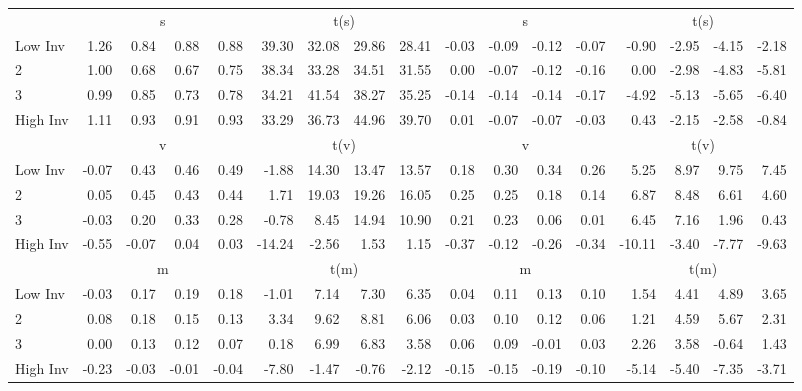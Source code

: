 \begin{table}[!ht]
\begin{tabular}{lrrrrrrrrrrrrrrrr}
  
     & \multicolumn{4}{c}{s} & \multicolumn{4}{c}{t(s)}  & \multicolumn{4}{c}{s} & \multicolumn{4}{c}{t(s)}   \\
     \cmidrule(r){2-5} \cmidrule(r){6-9}  \cmidrule(r){10-13} \cmidrule(r){14-17} 
    Low Inv  & 1.26  & 0.84  & 0.88  & 0.88  & 39.30  & 32.08  & 29.86  & 28.41  & -0.03  & -0.09  & -0.12  & -0.07  & -0.90  & -2.95  & -4.15  & -2.18   \\
    2  & 1.00  & 0.68  & 0.67  & 0.75  & 38.34  & 33.28  & 34.51  & 31.55  & 0.00  & -0.07  & -0.12  & -0.16  & 0.00  & -2.98  & -4.83  & -5.81   \\
    3  & 0.99  & 0.85  & 0.73  & 0.78  & 34.21  & 41.54  & 38.27  & 35.25  & -0.14  & -0.14  & -0.14  & -0.17  & -4.92  & -5.13  & -5.65  & -6.40   \\
    High Inv  & 1.11  & 0.93  & 0.91  & 0.93  & 33.29  & 36.73  & 44.96  & 39.70  & 0.01  & -0.07  & -0.07  & -0.03  & 0.43  & -2.15  & -2.58  & -0.84   \\
    
  
     & \multicolumn{4}{c}{v} & \multicolumn{4}{c}{t(v)}  & \multicolumn{4}{c}{v} & \multicolumn{4}{c}{t(v)}   \\
     \cmidrule(r){2-5} \cmidrule(r){6-9}  \cmidrule(r){10-13} \cmidrule(r){14-17} 
    Low Inv  & -0.07  & 0.43  & 0.46  & 0.49  & -1.88  & 14.30  & 13.47  & 13.57  & 0.18  & 0.30  & 0.34  & 0.26  & 5.25  & 8.97  & 9.75  & 7.45   \\
    2  & 0.05  & 0.45  & 0.43  & 0.44  & 1.71  & 19.03  & 19.26  & 16.05  & 0.25  & 0.25  & 0.18  & 0.14  & 6.87  & 8.48  & 6.61  & 4.60   \\
    3  & -0.03  & 0.20  & 0.33  & 0.28  & -0.78  & 8.45  & 14.94  & 10.90  & 0.21  & 0.23  & 0.06  & 0.01  & 6.45  & 7.16  & 1.96  & 0.43   \\
    High Inv  & -0.55  & -0.07  & 0.04  & 0.03  & -14.24  & -2.56  & 1.53  & 1.15  & -0.37  & -0.12  & -0.26  & -0.34  & -10.11  & -3.40  & -7.77  & -9.63   \\
    
  
     & \multicolumn{4}{c}{m} & \multicolumn{4}{c}{t(m)}  & \multicolumn{4}{c}{m} & \multicolumn{4}{c}{t(m)}   \\
     \cmidrule(r){2-5} \cmidrule(r){6-9}  \cmidrule(r){10-13} \cmidrule(r){14-17} 
    Low Inv  & -0.03  & 0.17  & 0.19  & 0.18  & -1.01  & 7.14  & 7.30  & 6.35  & 0.04  & 0.11  & 0.13  & 0.10  & 1.54  & 4.41  & 4.89  & 3.65   \\
    2  & 0.08  & 0.18  & 0.15  & 0.13  & 3.34  & 9.62  & 8.81  & 6.06  & 0.03  & 0.10  & 0.12  & 0.06  & 1.21  & 4.59  & 5.67  & 2.31   \\
    3  & 0.00  & 0.13  & 0.12  & 0.07  & 0.18  & 6.99  & 6.83  & 3.58  & 0.06  & 0.09  & -0.01  & 0.03  & 2.26  & 3.58  & -0.64  & 1.43   \\
    High Inv  & -0.23  & -0.03  & -0.01  & -0.04  & -7.80  & -1.47  & -0.76  & -2.12  & -0.15  & -0.15  & -0.19  & -0.10  & -5.14  & -5.40  & -7.35  & -3.71   \\
    

\end{tabular}
\end{table}

